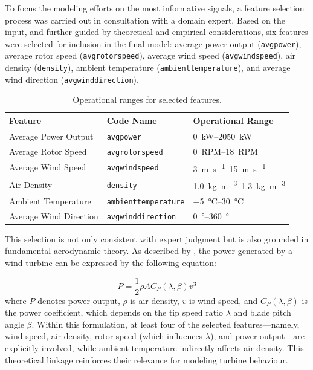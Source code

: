 To focus the modeling efforts on the most informative signals, a feature selection process was carried out in consultation with a domain expert.
Based on the input, and further guided by theoretical and empirical considerations, six features were selected for inclusion in the final model: average power output (\texttt{avgpower}), average rotor speed (\texttt{avgrotorspeed}), average wind speed (\texttt{avgwindspeed}), air density (\texttt{density}), ambient temperature (\texttt{ambienttemperature}), and average wind direction (\texttt{avgwinddirection}).

\begin{table}[H]
\centering
\caption{Operational ranges for selected features.}
\label{tab:feature-ranges}
\begin{tabular}{lll}
    \toprule
    \textbf{Feature} & \textbf{Code Name} & \textbf{Operational Range} \\
    \midrule

    Average Power Output & 
    \texttt{avgpower} & 
    \SIrange{0}{2050}{\kilo\watt} \\

    Average Rotor Speed &
    \texttt{avgrotorspeed} & 
    \SIrange{0}{18}{RPM} \\

    Average Wind Speed & 
    \texttt{avgwindspeed} & 
    \SIrange{3}{15}{\meter\per\second} \\

    Air Density & 
    \texttt{density} & 
    \SIrange{1.0}{1.3}{\kilogram\per\cubic\meter} \\

    Ambient Temperature & 
    \texttt{ambienttemperature} & 
    \SIrange{-5}{30}{\degreeCelsius} \\

    Average Wind Direction & 
    \texttt{avgwinddirection} & 
    \SIrange{0}{360}{\degree} \\

    \bottomrule
\end{tabular}
\end{table}


This selection is not only consistent with expert judgment but is also grounded in fundamental aerodynamic theory.
As described by \cite{bilendo_normal_2022}, the power generated by a wind turbine can be expressed by the following equation:


\begin{equation}
\label{eq:power-curve}
P = \frac{1}{2} \rho A C_P(\lambda, \beta) v^3
\end{equation}
where \(P\) denotes power output, \(\rho\) is air density, \(v\) is wind speed, and \(C_P(\lambda, \beta)\) is the power coefficient, which depends on the tip speed ratio \(\lambda\) and blade pitch angle \(\beta\).
Within this formulation, at least four of the selected features—namely, wind speed, air density, rotor speed (which influences \(\lambda\)), and power output—are explicitly involved, while ambient temperature indirectly affects air density.
This theoretical linkage reinforces their relevance for modeling turbine behaviour.

